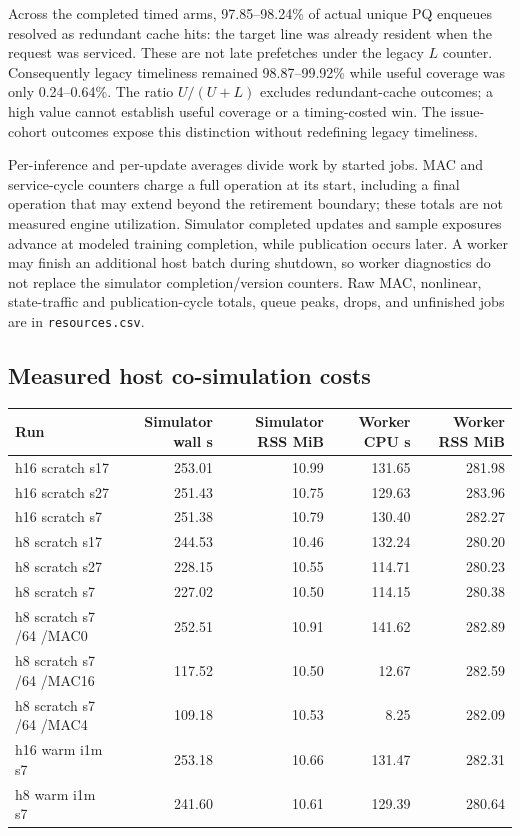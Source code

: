 \documentclass[10pt]{article}
\begin{document}
Across the completed timed arms, 97.85--98.24\% of actual unique PQ enqueues resolved as redundant cache hits: the target line was already resident when the request was serviced. These are not late prefetches under the legacy $L$ counter. Consequently legacy timeliness remained 98.87--99.92\% while useful coverage was only 0.24--0.64\%. The ratio $U/(U+L)$ excludes redundant-cache outcomes; a high value cannot establish useful coverage or a timing-costed win. The issue-cohort outcomes expose this distinction without redefining legacy timeliness.

Per-inference and per-update averages divide work by started jobs. MAC and service-cycle counters charge a full operation at its start, including a final operation that may extend beyond the retirement boundary; these totals are not measured engine utilization. Simulator completed updates and sample exposures advance at modeled training completion, while publication occurs later. A worker may finish an additional host batch during shutdown, so worker diagnostics do not replace the simulator completion/version counters. Raw MAC, nonlinear, state-traffic and publication-cycle totals, queue peaks, drops, and unfinished jobs are in \texttt{resources.csv}.

\subsection{Measured host co-simulation costs}

\begin{center}
\scriptsize
\begin{longtable}{lrrrr}
\toprule
Run & Simulator wall s & Simulator RSS MiB & Worker CPU s & Worker RSS MiB \\
\midrule
\endhead
h16 scratch s17 & 253.01 & 10.99 & 131.65 & 281.98 \\
h16 scratch s27 & 251.43 & 10.75 & 129.63 & 283.96 \\
h16 scratch s7 & 251.38 & 10.79 & 130.40 & 282.27 \\
h8 scratch s17 & 244.53 & 10.46 & 132.24 & 280.20 \\
h8 scratch s27 & 228.15 & 10.55 & 114.71 & 280.23 \\
h8 scratch s7 & 227.02 & 10.50 & 114.15 & 280.38 \\
h8 scratch s7 /64 /MAC0 & 252.51 & 10.91 & 141.62 & 282.89 \\
h8 scratch s7 /64 /MAC16 & 117.52 & 10.50 & 12.67 & 282.59 \\
h8 scratch s7 /64 /MAC4 & 109.18 & 10.53 & 8.25 & 282.09 \\
h16 warm i1m s7 & 253.18 & 10.66 & 131.47 & 282.31 \\
h8 warm i1m s7 & 241.60 & 10.61 & 129.39 & 280.64 \\
\bottomrule
\end{longtable}
\end{center}
\end{document}

